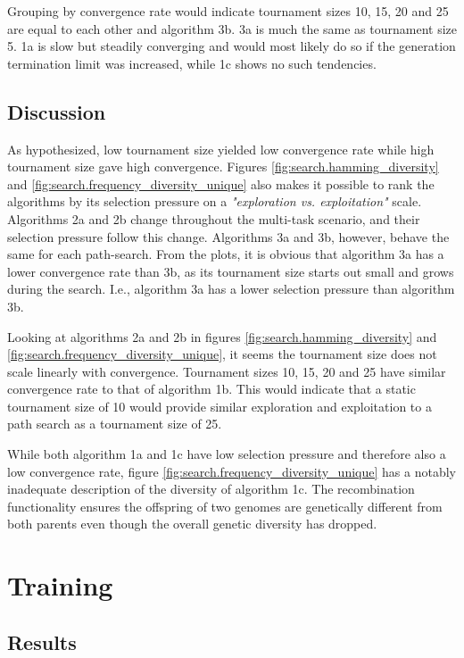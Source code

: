 Grouping by convergence rate would indicate tournament sizes 10, 15, 20 and 25 are equal to each other and algorithm 3b. 3a is much the same as tournament size 5. 1a is slow but steadily converging and would most likely do so if the generation termination limit was increased, while 1c shows no such tendencies. 

\subsection{Discussion}
As hypothesized, low tournament size yielded low convergence rate while high tournament size gave high convergence. Figures \ref{fig:search.hamming_diversity} and \ref{fig:search.frequency_diversity_unique} also makes it possible to rank the algorithms by its selection pressure on a \textit{"exploration vs. exploitation"} scale. Algorithms 2a and 2b change throughout the multi-task scenario, and their selection pressure follow this change. Algorithms 3a and 3b, however, behave the same for each path-search. From the plots, it is obvious that algorithm 3a has a lower convergence rate than 3b, as its tournament size starts out small and grows during the search. I.e., algorithm 3a has a lower selection pressure than algorithm 3b. 

Looking at algorithms 2a and 2b in figures \ref{fig:search.hamming_diversity} and \ref{fig:search.frequency_diversity_unique}, it seems the tournament size does not scale linearly with convergence. Tournament sizes 10, 15, 20 and 25 have similar convergence rate to that of algorithm 1b. This would indicate that a static tournament size of 10 would provide similar exploration and exploitation to a path search as a tournament size of 25. 

While both algorithm 1a and 1c have low selection pressure and therefore also a low convergence rate, figure \ref{fig:search.frequency_diversity_unique} has a notably inadequate description of the diversity of algorithm 1c. The recombination functionality ensures the offspring of two genomes are genetically different from both parents even though the overall genetic diversity has dropped.

\section{Training}

\subsection{Results}

